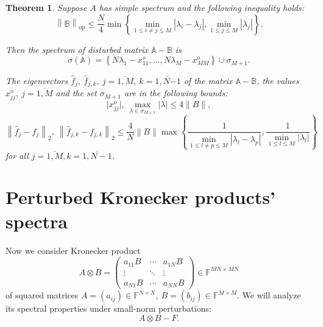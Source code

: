 \documentclass[14pt,a4paper]{extarticle}
\newtheorem{thm}{Theorem}
\theoremstyle{definition}
\begin{document}
\begin{thm}\label{nk:thm:tiled}
Suppose \( A \) has simple spectrum and the following inequality holds:
\[
    \left\| \mathbb{B} \right\|_{\mathrm{op}}
        \leq 
        \frac{N}{4}
         \min\left\{
             \min\limits_{1\leq i{\neq}j \leq M }{|\lambda_i - \lambda_j|},
             \min\limits_{1\leq j \leq M}{|\lambda_j|}
         \right\}.
 \]

Then the spectrum of disturbed matrix \( \mathbb{A} - \mathbb{B} \) is
\[
    \sigma\left(\mathbb{A}\right) =
        \left\{
            N\lambda_1 - x_{11}^o, \ldots, N\lambda_M - x_{MM}^o
        \right\}
    \cup \sigma_{M{+}1}.
\]

The eigenvectors
    \( \hat{f}_j,\ \hat{f}_{j,k},\ j{=}\overline{1,M},\ k{=}\overline{1,N{-1}} \)
    of the matrix \( \mathbb{A}{-}\mathbb{B} \),
    the values \( x_{jj}^o,\ j{=}\overline{1,M} \)
    and the set \( \sigma_{M{+}1} \) are in the following bounds:
\[
    \lvert x_{jj}^o\rvert,
    \ \max_{\lambda\in\sigma_{M{+}1}} \lvert\lambda\rvert
    \leq 4\|B\|,
\]
\[
    \left\| \hat{f}_j - f_j \right\|_2,
    \ \left\| \hat{f}_{j,k} - f_{j,k}\right\|_2
    \leq
    \frac4N \|B\|
         \max\left\{
         \frac{1}{
             \min\limits_{1\leq l{\neq}p \leq M }{|\lambda_l - \lambda_p|}},
         \frac{1}{
             \min\limits_{1\leq l \leq M}{|\lambda_l|}}
         \right\}
\]
for all \( j{=}\overline{1,M}, k{=}\overline{1,N-1} \).
\end{thm}

\section{Perturbed Kronecker products' spectra}

Now we consider Kronecker product
\[
    A\otimes B =
    \begin{pmatrix}
        a_{11} B & \cdots & a_{1N} B \\
        \vdots   & \ddots & \vdots \\
        a_{N1} B & \cdots & a_{NN} B
    \end{pmatrix}
    \in \mathbb{F}^{{MN}{\times}{MN}}
\]
of squared matrices
\( A={(a_{ij})}\in\mathbb{F}^{N{\times}N},
 \ B={(b_{ij})}\in\mathbb{F}^{M{\times}M}. \)
We will analyze its spectral properties
    under small-norm perturbations:
\begin{equation}\label{-kronperturb}
    A\otimes B - F.
\end{equation}
\end{document}
